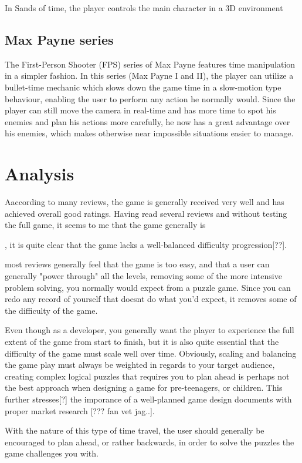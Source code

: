 In Sands of time, the player controls the main character in a 3D environment 

\subsection{Max Payne series}
The First-Person Shooter (FPS) series of Max Payne features time manipulation in a simpler fashion. In this series (Max Payne I and II), 
the player can utilize a bullet-time mechanic which slows down the game time in a slow-motion type behaviour, enabling the user to perform any action he normally would.
Since the player can still move the camera in real-time and has more time to spot his enemies and plan his actions more carefully, 
he now has a great advantage over his enemies, which makes otherwise near impossible situations easier to manage. 


\section{Analysis}
Aaccording to many reviews, the game is generally received very well and has achieved overall good ratings. Having read several reviews and without testing the full game, it seems to me that the game generally is 

, it is quite clear that the game lacks a well-balanced difficulty progression[??]. 

most reviews generally feel that the game is too easy,
 and that a user can generally "power through" all the levels, removing some of the more intensive problem solving, you normally would expect from a puzzle game. Since you can
 redo any record of yourself that doesnt do what you'd expect, it removes some of the difficulty of the game.

Even though as a developer, you generally want the player to experience the full extent of the game from start to finish, but it is also quite essential
 that the difficulty of the game must scale well over time. Obviously, scaling and balancing the game play must always be weighted in regards to your target audience,
 creating complex logical puzzles that requires you to plan ahead is perhaps not the best approach when designing a game for pre-teenagers, or children. 
This further stresses[?] the imporance of a well-planned game design documents with proper market research [??? fan vet jag..]. 

With the nature of this type of time travel, the user should generally be encouraged to plan ahead, or rather backwards, in order to solve the puzzles the game challenges you with. 



